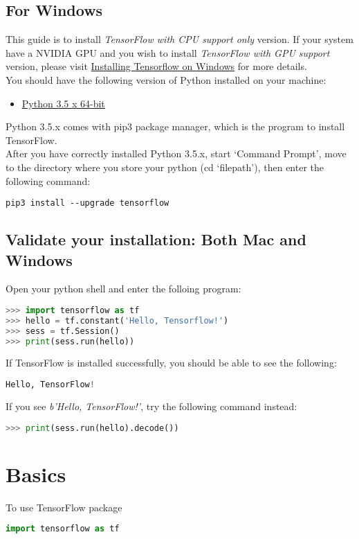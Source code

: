 \documentclass{article}
\begin{document}
	\subsection{For Windows}
		This guide is to install \emph{TensorFlow with CPU support only} version. If your system have a NVIDIA GPU and you wish to install \emph{TensorFlow with GPU support} version, please visit \href{https://www.tensorflow.org/install/install_windows}{Installing Tensorflow on Windows} for more details.\\
		You should have the following version of Python installed on your machine: \begin{itemize}[nolistsep]
		\item \href{https://www.python.org/downloads/release/python-352/}{\underline{Python 3.5 x 64-bit}}
		\end{itemize}
		Python 3.5.x comes with pip3 package manager, which is the program to install TensorFlow.\\
		After you have correctly installed Python 3.5.x, start `Command Prompt', move to the directory where you store your python (cd `filepath'), then enter the following command:
\begin{lstlisting}[numbers=none]
pip3 install --upgrade tensorflow		
\end{lstlisting}

		\subsection{Validate your installation: Both Mac and Windows}
		Open your python shell and enter the folloing program:
\begin{lstlisting}[numbers=none,language=Python,morekeywords ={as}]
>>> import tensorflow as tf
>>> hello = tf.constant('Hello, Tensorflow!')
>>> sess = tf.Session()
>>> print(sess.run(hello))	
\end{lstlisting}
		If TensorFlow is installed successfully, you should be able to see the following:
\begin{lstlisting}[numbers=none,language=Python]
Hello, TensorFlow!
\end{lstlisting}
		If you see \emph{b'Hello, TensorFlow!'}, try the following command instead:
\begin{lstlisting}[numbers=none,language=Python]
>>> print(sess.run(hello).decode())
\end{lstlisting}
	
	\section{Basics}
	To use TensorFlow package
\begin{lstlisting}[numbers=none,language=Python,morekeywords ={as}]
import tensorflow as tf
\end{lstlisting}
\end{document}
